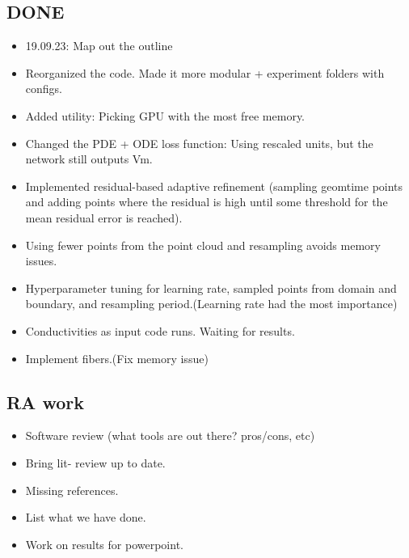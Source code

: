 \documentclass{article}
\begin{document}
\subsection{DONE}
\begin{itemize}
    \item 19.09.23: Map out the outline
    \item Reorganized the code. Made it more modular + experiment folders with configs.
    \item Added utility: Picking GPU with the most free memory.
    \item Changed the PDE + ODE loss function: Using rescaled units, but the network still outputs Vm.
    \item Implemented residual-based adaptive refinement (sampling geomtime points and adding points where the residual is high until some threshold for the mean residual error is reached).
    \item  Using fewer points from the point cloud and resampling avoids memory issues.
    \item Hyperparameter tuning for learning rate, sampled points from domain and boundary, and resampling period.(Learning rate had the most importance)

    \item Conductivities as input code runs. Waiting for results.
    \item Implement fibers.(Fix memory issue) 
    

\end{itemize}


\subsection{RA work}
\begin{itemize}
\item Software review (what tools are out there? pros/cons, etc)
\item Bring lit- review up to date.
\item Missing references.
\item List what we have done.
\item Work on results for powerpoint.
\end{itemize}
\end{document}

